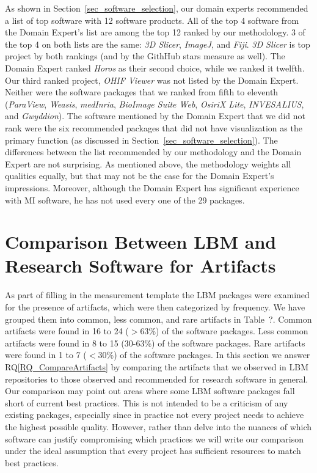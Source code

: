 \documentclass[final, 3p, times, authoryear]{elsarticle}
\newcommand{\rqref}[1]{RQ\ref{#1}}
\begin{document}
As shown in Section~\ref{sec_software_selection}, our domain experts recommended
a list of top software with 12 software products.  All of the top 4 software
from the Domain Expert's list are among the top 12 ranked by our methodology. 3
of the top 4 on both lists are the same: \textit{3D Slicer}, \textit{ImageJ},
and \textit{Fiji}. \textit{3D Slicer} is top project by both rankings (and by
the GithHub stars measure as well).  The Domain Expert ranked \textit{Horos} as
their second choice, while we ranked it twelfth.  Our third ranked project,
\textit{OHIF Viewer} was not listed by the Domain Expert.  Neither were the
software packages that we ranked from fifth to eleventh (\textit{ParaView},
\textit{Weasis}, \textit{medInria}, \textit{BioImage Suite Web}, \textit{OsiriX
Lite}, \textit{INVESALIUS}, and \textit{Gwyddion}).  The software mentioned by
the Domain Expert that we did not rank were the six recommended packages that
did not have visualization as the primary function (as discussed in
Section~\ref{sec_software_selection}).  The differences between the list
recommended by our methodology and the Domain Expert are not surprising.  As
mentioned above, the methodology weights all qualities equally, but that may not
be the case for the Domain Expert's impressions.  Moreover, although the Domain
Expert has significant experience with MI software, he has not used every one of
the 29 packages.

\section{Comparison Between LBM and Research Software for Artifacts}
\label{Sec_CompareArtifacts}

As part of filling in the measurement template the LBM packages were examined
for the presence of artifacts, which were then categorized by frequency. We have
grouped them into common, less common, and rare artifacts in
Table~?. Common artifacts were found in 16 to 24 ($>$63\%)
of the software packages. Less common artifacts were found in 8 to 15 (30-63\%)
of the software packages. Rare artifacts were found in 1 to 7 ($<$30\%) of the
software packages.  In this section we answer \rqref{RQ_CompareArtifacts} by
comparing the artifacts that we observed in LBM repositories to those observed
and recommended for research software in general. Our comparison may point out
areas where some LBM software packages fall short of current best practices.
This is not intended to be a criticism of any existing packages, especially
since in practice not every project needs to achieve the highest possible
quality.  However, rather than delve into the nuances of which software can
justify compromising which practices we will write our comparison under the
ideal assumption that every project has sufficient resources to match best
practices.
\end{document}
